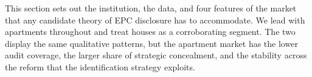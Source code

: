 This section sets out the institution, the data, and four features of the market that any
candidate theory of EPC disclosure has to accommodate. We lead with apartments throughout and
treat houses as a corroborating segment. The two display the same qualitative patterns, but the
apartment market has the lower audit coverage, the larger share of strategic concealment, and the
stability across the reform that the identification strategy exploits.
